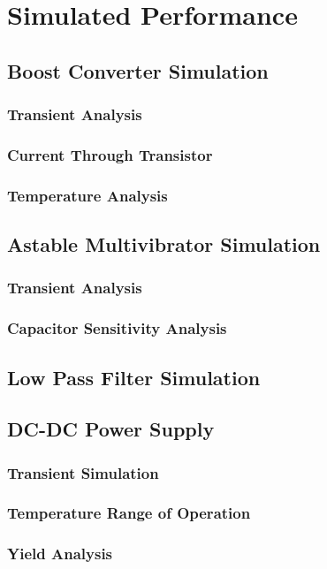 \documentclass[11pt]{article}
\begin{document}
\section{Simulated Performance}

\subsection{Boost Converter Simulation}
\subsubsection{Transient Analysis}
\subsubsection{Current Through Transistor}
\subsubsection{Temperature Analysis}

\subsection{Astable Multivibrator Simulation}
\subsubsection{Transient Analysis}
\subsubsection{Capacitor Sensitivity Analysis}

\subsection{Low Pass Filter Simulation}

\subsection{DC-DC Power Supply}
\subsubsection{Transient Simulation}
\subsubsection{Temperature Range of Operation}
\subsubsection{Yield Analysis}
\end{document}
